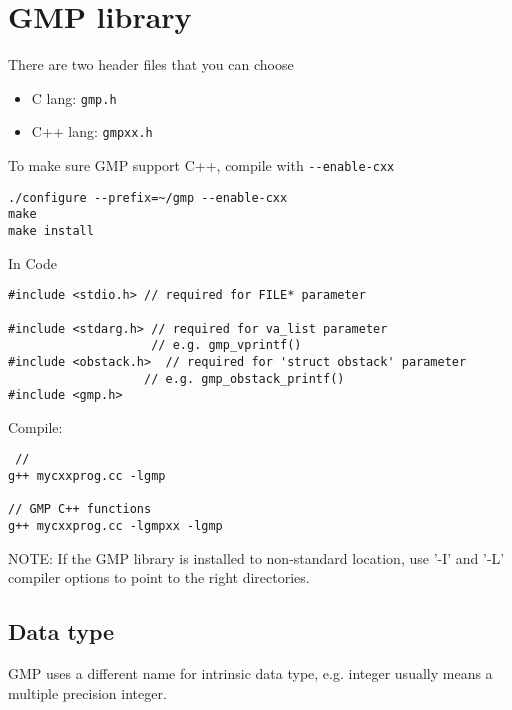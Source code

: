 \chapter{GMP library}
\label{chap:GMP-lib}

There are two header files that you can choose
\begin{itemize}
  \item C lang: \verb!gmp.h!
  
  \item C++ lang: \verb!gmpxx.h!
\end{itemize}
To make sure GMP support C++, compile with \verb!--enable-cxx! 
\begin{verbatim}
./configure --prefix=~/gmp --enable-cxx
make
make install
\end{verbatim}

In Code
\begin{verbatim}
#include <stdio.h> // required for FILE* parameter

#include <stdarg.h> // required for va_list parameter
                    // e.g. gmp_vprintf()
#include <obstack.h>  // required for 'struct obstack' parameter
                   // e.g. gmp_obstack_printf()
#include <gmp.h> 
\end{verbatim}


Compile: 
\begin{verbatim}
 // 
g++ mycxxprog.cc -lgmp

// GMP C++ functions
g++ mycxxprog.cc -lgmpxx -lgmp
\end{verbatim}

NOTE: If the GMP library is installed to non-standard location, use '-I' and
'-L' compiler options to point to the right directories.

\section{Data type }
\label{sec:GMP-datatypes}

GMP uses a different name for intrinsic data type, e.g. integer usually means a
multiple precision integer.


